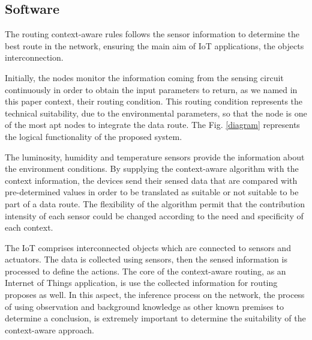 
\subsection{Software}

The routing context-aware rules follows the sensor information to determine the best route in the network, ensuring the main aim of IoT applications, the objects interconnection.

Initially, the nodes monitor the information coming from the sensing circuit continuously in order to obtain the input parameters to return, as we named in this paper context, their routing condition. This routing condition represents the technical suitability, due to the environmental parameters, so that the node is one of the most apt nodes to integrate the data route. The Fig. \ref{diagram} represents the logical functionality of the proposed system.

The luminosity, humidity and temperature sensors provide the information about the environment conditions. By supplying the context-aware algorithm with the context information, the devices send their sensed data that are compared with pre-determined values in order to be translated as suitable or not suitable to be part of a data route. The flexibility of the algorithm permit that the contribution intensity of each sensor could be changed according to the need and specificity of each context.

\begin{minipage}{.50\textwidth}

\end{minipage}

The IoT comprises interconnected objects which are connected to sensors and actuators. The data is collected using sensors, then the sensed information is processed to define the actions. The core of the context-aware routing, as an Internet of Things application, is use the collected information for routing proposes as well. In this aspect, the inference process on the network, the process of using observation and background knowledge as other known premises to determine a conclusion, is extremely important to determine the suitability of the context-aware approach.

